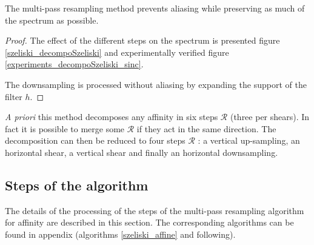 	\begin{thm}
	The multi-pass resampling method \cite{szeliski2010high} prevents aliasing while preserving as much of the spectrum as possible. %
	\end{thm}
	\begin{proof}
	The effect of the different steps on the spectrum is presented figure \ref{szeliski_decompoSzeliski} and experimentally verified figure \ref{experiments_decompoSzeliski_sinc}.
	
	The downsampling is processed without aliasing by expanding the support of the filter $h$.
	\end{proof}
	
	
	
	\emph{A priori} this method decomposes any affinity in six steps $\mathcal R$ (three per shears). In fact it is possible to merge some $\mathcal R$ if they act in the same direction. The decomposition can then be reduced to four steps $\mathcal R$ : a vertical up-sampling, an horizontal shear, a vertical shear and finally an horizontal downsampling.
	
	
\subsection{Steps of the algorithm}
	\label{szeliski_affine_section}
	
	The details of the processing of the steps of the multi-pass resampling algorithm for affinity are described in this section. The corresponding algorithms can be found in appendix (algorithms \ref{szeliski_affine} and following).
	
